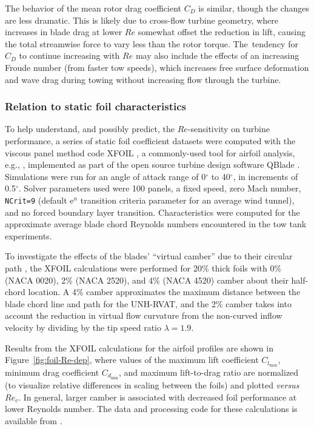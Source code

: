 The behavior of the mean rotor drag coefficient $C_D$ is similar, though the
changes are less dramatic. This is likely due to cross-flow turbine geometry,
where increases in blade drag at lower $Re$ somewhat offset the reduction in
lift, causing the total streamwise force to vary less than the rotor torque.
The~tendency for $C_D$ to continue increasing with $Re$ may also include the
effects of an increasing Froude number (from faster tow speeds), which increases
free surface deformation and wave drag during towing without increasing flow
through the turbine.


\subsubsection{Relation to static foil characteristics}

To help understand, and possibly predict, the $Re$-sensitivity on turbine
performance, a series of static foil coefficient datasets were computed with the
viscous panel method code XFOIL \cite{Drela1989}, a commonly-used tool for
airfoil analysis, e.g., \cite{Castelli2011, Walker2014}, implemented as part of
the open source turbine design software QBlade \cite{Marten2013}. Simulations
were run for an angle of attack range of 0$^{\circ}$ to 40$^{\circ}$, in
increments of 0.5$^{\circ}$. Solver parameters used were 100 panels, a fixed
speed, zero Mach number, \texttt{NCrit=9} (default $\mathrm{e}^n$ transition
criteria parameter for an average wind tunnel), and no forced boundary layer
transition. Characteristics were computed for the approximate average blade
chord Reynolds numbers encountered in the tow tank experiments.

To investigate the effects of the blades' ``virtual camber'' due to their
circular path \cite{Migliore1980}, the XFOIL calculations were performed for
20\% thick foils with 0\% (NACA 0020), 2\% (NACA 2520), and 4\% (NACA 4520)
camber about their half-chord location. A 4\% camber approximates the maximum
distance between the blade chord line and path for the UNH-RVAT, and the 2\%
camber takes into account the reduction in virtual flow curvature from the
non-curved inflow velocity by dividing by the tip speed ratio $\lambda=1.9$.

Results from the XFOIL calculations for the airfoil profiles are shown in
Figure~\ref{fig:foil-Re-dep}, where values of the maximum lift coefficient
$C_{l_{\max}}$, minimum drag coefficient $C_{d_{\min}}$, and maximum
lift-to-drag ratio are normalized (to visualize relative differences in scaling
between the foils) and plotted \textit{versus} $Re_c$. In general, larger camber
is associated with decreased foil performance at lower Reynolds number. The data
and processing code for these calculations is available from
\cite{Bachant2016-NACAXX20-XFOIL}.

